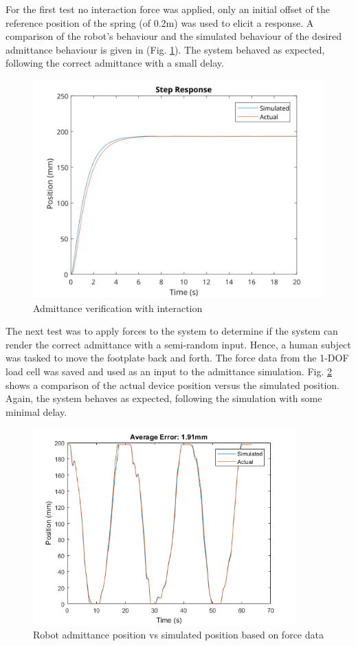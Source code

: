 \documentclass[12pt]{report}
\begin{document}
For the first test no interaction force was applied, only an initial offset of the reference position of the spring (of 0.2m) was used to elicit a response. A comparison of the robot's behaviour and the simulated behaviour of the desired admittance behaviour is given in (Fig. \ref{fig:nVerNoInt}). The system behaved as expected, following the correct admittance with a small delay.

\begin{figure}[t] 
	\centering
	\includegraphics[width=0.9\linewidth]{Mar12_NoForce_Step_Plot}
	\caption{Admittance verification with interaction}
	\label{fig:nVerNoInt}
\end{figure}

The next test was to apply forces to the system to determine if the system can render the correct admittance with a semi-random input. Hence, a human subject was tasked to move the footplate back and forth. The force data from the 1-DOF load cell was saved and used as an input to the admittance simulation. Fig. \ref{fig:adm_sim} shows a comparison of the actual device position versus the simulated position. Again, the system behaves as expected, following the simulation with some minimal delay.

\begin{figure}[h]
	\centering
	\includegraphics[width=0.9\textwidth]{admittance_sim}
	\caption{Robot admittance position vs simulated position based on force data}
	\label{fig:adm_sim}
\end{figure}	
\end{document}
